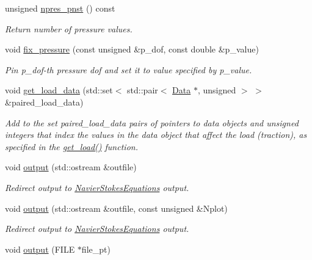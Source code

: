 \begin{DoxyCompactItemize}
unsigned \hyperlink{classoomph_1_1PolarCrouzeixRaviartElement_a22bc07f82b9e2c5b373db917ca071085}{npres\+\_\+pnst} () const
\begin{DoxyCompactList}\small\item\em Return number of pressure values. \end{DoxyCompactList}\item 
void \hyperlink{classoomph_1_1PolarCrouzeixRaviartElement_a10ce59c8e1796c0fcac9c0b3b6a89568}{fix\+\_\+pressure} (const unsigned \&p\+\_\+dof, const double \&p\+\_\+value)
\begin{DoxyCompactList}\small\item\em Pin p\+\_\+dof-\/th pressure dof and set it to value specified by p\+\_\+value. \end{DoxyCompactList}\item 
void \hyperlink{classoomph_1_1PolarCrouzeixRaviartElement_a575257c6dc7b44e56c687066cbda3791}{get\+\_\+load\+\_\+data} (std\+::set$<$ std\+::pair$<$ \hyperlink{classoomph_1_1Data}{Data} $\ast$, unsigned $>$ $>$ \&paired\+\_\+load\+\_\+data)
\begin{DoxyCompactList}\small\item\em Add to the set paired\+\_\+load\+\_\+data pairs of pointers to data objects and unsigned integers that index the values in the data object that affect the load (traction), as specified in the \hyperlink{classoomph_1_1PolarNavierStokesEquations_a47ae24dc603a7d46bd4a85ccfb2b8e23}{get\+\_\+load()} function. \end{DoxyCompactList}\item 
void \hyperlink{classoomph_1_1PolarCrouzeixRaviartElement_ad93900ce702a77bb8d7710cf0f22ea8d}{output} (std\+::ostream \&outfile)
\begin{DoxyCompactList}\small\item\em Redirect output to \hyperlink{classoomph_1_1NavierStokesEquations}{Navier\+Stokes\+Equations} output. \end{DoxyCompactList}\item 
void \hyperlink{classoomph_1_1PolarCrouzeixRaviartElement_ac170ddb5c2a7047d46a20d8c41da22df}{output} (std\+::ostream \&outfile, const unsigned \&Nplot)
\begin{DoxyCompactList}\small\item\em Redirect output to \hyperlink{classoomph_1_1NavierStokesEquations}{Navier\+Stokes\+Equations} output. \end{DoxyCompactList}\item 
void \hyperlink{classoomph_1_1PolarCrouzeixRaviartElement_a3ebab0f1e7981aaab9100fcaa39cd7a4}{output} (F\+I\+LE $\ast$file\+\_\+pt)

\end{DoxyCompactItemize}
